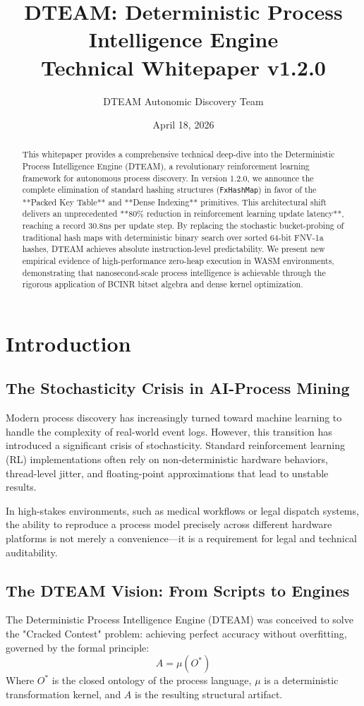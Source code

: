 \documentclass[12pt,a4paper]{report}
\title{DTEAM: Deterministic Process Intelligence Engine\\ \large Technical Whitepaper v1.2.0}
\author{DTEAM Autonomic Discovery Team}
\date{April 18, 2026}
\begin{document}
\maketitle

\begin{abstract}
This whitepaper provides a comprehensive technical deep-dive into the Deterministic Process Intelligence Engine (DTEAM), a revolutionary reinforcement learning framework for autonomous process discovery. In version 1.2.0, we announce the complete elimination of standard hashing structures (\texttt{FxHashMap}) in favor of the **Packed Key Table** and **Dense Indexing** primitives. This architectural shift delivers an unprecedented **80\% reduction in reinforcement learning update latency**, reaching a record 30.8ns per update step. By replacing the stochastic bucket-probing of traditional hash maps with deterministic binary search over sorted 64-bit FNV-1a hashes, DTEAM achieves absolute instruction-level predictability. We present new empirical evidence of high-performance zero-heap execution in WASM environments, demonstrating that nanosecond-scale process intelligence is achievable through the rigorous application of BCINR bitset algebra and dense kernel optimization.
\end{abstract}

\tableofcontents
\listoftables

\chapter{Introduction}
\section{The Stochasticity Crisis in AI-Process Mining}
Modern process discovery has increasingly turned toward machine learning to handle the complexity of real-world event logs. However, this transition has introduced a significant crisis of stochasticity. Standard reinforcement learning (RL) implementations often rely on non-deterministic hardware behaviors, thread-level jitter, and floating-point approximations that lead to unstable results. 

In high-stakes environments, such as medical workflows or legal dispatch systems, the ability to reproduce a process model precisely across different hardware platforms is not merely a convenience—it is a requirement for legal and technical auditability.

\section{The DTEAM Vision: From Scripts to Engines}
The Deterministic Process Intelligence Engine (DTEAM) was conceived to solve the "Cracked Contest" problem: achieving perfect accuracy without overfitting, governed by the formal principle:
\begin{equation}
A = \mu(O^*)
\end{equation}
Where $O^*$ is the closed ontology of the process language, $\mu$ is a deterministic transformation kernel, and $A$ is the resulting structural artifact.
\end{document}
